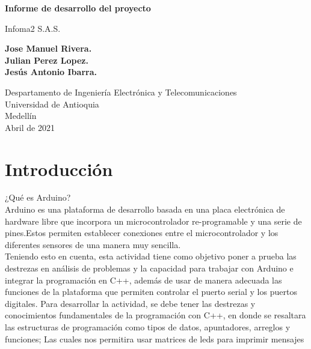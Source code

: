 \documentclass{article}
\begin{document}
\begin{titlepage}
    \begin{center}
        \vspace*{1cm}
            
        \Huge
        \textbf{Informe de desarrollo del proyecto}
            
        \vspace{0.5cm}
        \LARGE
        Infoma2 S.A.S.
            
        \vspace{1.5cm}
            
        \textbf{Jose Manuel Rivera.\\
        Julian Perez Lopez.\\
        Jesús Antonio Ibarra.}
            
        \vfill
            
        \vspace{0.8cm}
            
        \Large
        Despartamento de Ingeniería Electrónica y Telecomunicaciones\\
        Universidad de Antioquia\\
        Medellín\\
        Abril de 2021
            
    \end{center}
\end{titlepage}

\tableofcontents
\newpage
\section{Introducción}\label{intro}
¿Qué es Arduino?\\

Arduino es una plataforma de desarrollo basada en una placa electrónica de hardware libre que incorpora un microcontrolador re-programable y una serie de pines.Estos permiten establecer conexiones entre el microcontrolador y los diferentes sensores de una manera muy sencilla.\\

Teniendo esto en cuenta, esta actividad tiene como objetivo poner a prueba las destrezas en análisis de problemas y la capacidad para trabajar con Arduino e integrar la programación en C++, además de usar de manera adecuada las funciones de la plataforma que permiten controlar el puerto serial y los puertos digitales. Para desarrollar la actividad, se debe tener las destrezas y conocimientos fundamentales de la programación con C++, en donde se  resaltara las estructuras de programación como tipos de datos, apuntadores, arreglos y funciones; Las cuales nos permitira usar matrices de leds para imprimir mensajes
\end{document}
